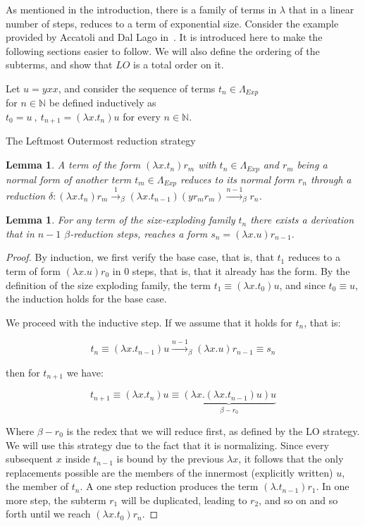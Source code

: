 \documentclass[12pt]{article}
\newtheorem{lemma}[theorem]{Lemma}
\begin{document}
As mentioned in the introduction, there is a family of terms in $\lambda$ that in a linear number of steps, reduces to a term of exponential size. Consider the example provided by Accatoli and Dal Lago in~\cite{beta-invariance}. It is introduced here to make the following sections easier to follow. We will also define the ordering of the subterms, and show that $LO$ is a total order on it.
\begin{center}
  Let $u = yxx$, and consider the sequence of terms $t_{n} \in \Lambda_{Exp}$  \\ for $n \in \mathbb{N}$ be defined inductively as \\
  $t_{0} = u \ , \ t_{n + 1} = (\lambda x.t_{n})u$ for every $n \in \mathbb{N}$.
\end{center}
The Leftmost Outermost reduction strategy
\begin{lemma}
  A term of the form $(\lambda x.t_{n})r_{m}$ with $t_{n} \in \Lambda_{Exp}$ and $r_{m}$ being a normal form of another term $t_{m} \in \Lambda_{Exp}$ reduces to its normal form $r_{n}$ through a reduction $\delta : (\lambda x .t_{n})r_{m} \xrightarrow{1}_{\beta} (\lambda x . t_{n-1})(yr_{m}r_{m}) \xrightarrow{n-1}_{\beta} r_{n}$.
\end{lemma}
\begin{lemma}For any term of the size-exploding family $t_{n}$ there exists a derivation that in $n-1$ $\beta$-reduction steps, reaches a form $s_{n} = (\lambda x. u)r_{n-1}$.
\end{lemma}
  \begin{proof}
  By induction, we first verify the base case, that is, that $t_{1}$ reduces to a term of form $(\lambda x . u) r_{0}$ in $0$ steps, that is, that it already has the form. By the definition of the size exploding family, the term $t_{1} \equiv (\lambda x . t_{0})u$, and since $t_{0} \equiv u$, the induction holds for the base case.


We proceed with the inductive step. If we assume that it holds for $t_{n}$, that is:
\begin{center}
\begin{equation}
  t_{n} \equiv (\lambda x . t_{n-1})u \xrightarrow{n-1}_{\beta} (\lambda x . u)r_{n-1} \equiv s_{n}
\end{equation}
\end{center}
then for $t_{n+1}$ we have:
\begin{center}
\begin{equation}
    t_{n+1} \equiv (\lambda x . t_{n}) u \equiv \underbrace{(\lambda x .(\lambda x . t_{n-1})u)u}_{\beta -r_{0}}
  \end{equation}
  \end{center}
 Where $\beta -r_{0}$ is the redex that we will reduce first, as defined by the LO strategy. We will use this strategy due to the fact that it is normalizing. Since every subsequent $x$ inside $t_{n-1}$ is bound by the previous $\lambda x$, it follows that the only replacements possible are the members of the innermost (explicitly written) $u$, the member of $t_{n}$. A one step reduction produces the term $(\lambda . t_{n-1}) r_{1}$. In one more step, the subterm $r_{1}$ will be duplicated, leading to $r_{2}$, and so on and so forth until we reach $(\lambda x . t_{0})r_{n}$.
\end{proof}
\end{document}
